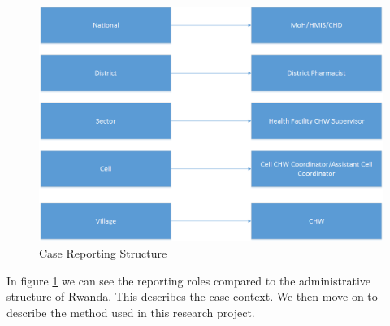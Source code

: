 \begin{figure}
\centering
\includegraphics[width=\textwidth]{context/img/reportingStructure}
\caption{Case Reporting Structure}
\label{fig:reportstructure}
\end{figure}

In figure \ref{fig:reportstructure} we can see the reporting roles compared to the administrative structure of Rwanda.
This describes the case context. 
We then move on to describe the method used in this research project. 
